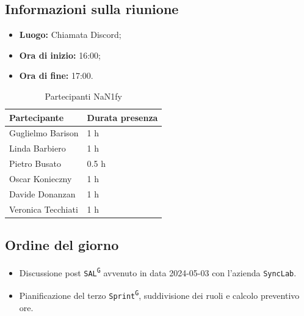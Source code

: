 \documentclass[8pt]{article}
\newcommand{\glossterm}[1]{#1\textsuperscript{G}} %
\begin{document}
\subsection{Informazioni sulla riunione}
\begin{itemize}
	\setlength\itemsep{0em}
	\item\textbf{Luogo:} Chiamata Discord;
	\item\textbf{Ora di inizio:} 16:00;
	\item\textbf{Ora di fine:}  17:00.
\end{itemize}
\begin{table}[ht!]
	\begin{minipage}[t]{0.5\linewidth}
		\centering
		\begin{tabular}{p{3cm} p{3cm}}
			\toprule
			\textbf{Partecipante} & \textbf{Durata presenza} \\
			\midrule
			Guglielmo Barison & 1 h \\
			Linda Barbiero &  1 h \\
			Pietro Busato & 0.5 h \\
			Oscar Konieczny & 1 h \\
			Davide Donanzan & 1 h \\
			Veronica Tecchiati & 1 h \\
			\bottomrule
		\end{tabular}
		\caption{Partecipanti NaN1fy}
		\label{table:Partecipanti NaN1fy}
	\end{minipage}
\end{table}
\subsection{Ordine del giorno}
\begin{itemize}
	\setlength\itemsep{0em}
	\item Discussione post \texttt{\glossterm{SAL}} avvenuto in data 2024-05-03 con l'azienda \texttt{SyncLab}.
	\item Pianificazione del terzo \texttt{\glossterm{Sprint}}, suddivisione dei ruoli e calcolo preventivo ore.
\end{itemize}
\end{document}
